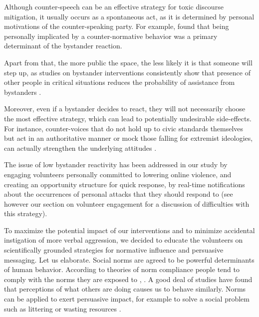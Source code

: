 \documentclass[preprint,12pt]{elsarticle}
\begin{document}
Although counter-speech can be an effective strategy for toxic discourse mitigation, it usually occurs as a spontaneous act, as it is determined by personal motivations of the counter-speaking party. For example, \citet{brauer2010descriptive} found that being personally implicated by a counter-normative behavior was a primary determinant of the bystander reaction. 

Apart from that, the more public the space, the less likely it is that someone will step up, as studies on bystander interventions consistently show that presence of other people in critical situations reduces the probability of assistance from bystanders \citep{fischer2011bystander}. %

Moreover, even if a bystander decides to react, they will not necessarily choose the most effective strategy, which can lead to potentially undesirable side-effects. For instance,  counter-voices that do not hold up to civic standards themselves but act in an authoritative manner or mock those falling for extremist ideologies, can actually strengthen the underlying attitudes \citep{ziegele2018journalistic, schieb2016governing, legault2011ironic}.

The issue of low bystander reactivity has been addressed in our study by engaging volunteers personally committed to lowering online violence, and creating an opportunity structure for quick response, by real-time notifications about the occurrences of personal attacks that they should respond to (see however our section on volunteer engagement for a discussion of difficulties with this strategy).

To maximize the potential impact of our interventions and to minimize  accidental instigation of more verbal aggression, we decided to educate the volunteers on scientifically grounded strategies for normative influence and persuasive messaging.  Let us elaborate.
 Social norms are agreed to be powerful determinants of human behavior. 
According to theories of norm compliance people tend to comply with the norms they are exposed to \citep{morris2018common}, \citep{cialdini1990focus}.  A good deal of studies have found that perceptions of what others are doing causes us to behave similarly. Norms can be applied to exert persuasive impact, for example to solve a social problem such as littering or wasting resources \citep{cialdini2006managing, cialdini1990focus, goldstein2008room}. 
\end{document}
